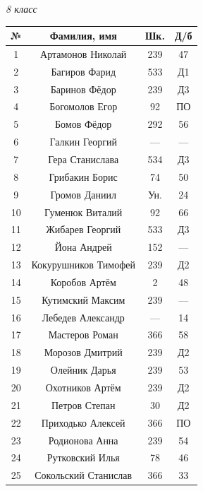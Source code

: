 \documentclass[11pt]{article}
\newlength{\h}
\newlength{\x}
\begin{document}
\begin{table}[ht]
  \begin{minipage}[t]{0.45\linewidth}\centering
    \begin{center}
      \textit{8 класс}
    \end{center}
    \begin{tabular}[h]{|c|c|c|c|}
      \hline
      \textbf{№} & \textbf{Фамилия, имя} & \textbf{Шк.} & \textbf{Д/б}\\
      \hline
      1 & Артамонов Николай & 239 & 47\\ \hline
      2 & Багиров Фарид & 533 & Д1 \\ \hline
      3 & Баринов Фёдор & 239 & Д3 \\ \hline
      4 & Богомолов Егор &  92 & ПО \\ \hline
      5 & Бомов Фёдор & 292 & 56 \\ \hline
      6 & Галкин Георгий & --- & --- \\ \hline
      7 & Гера Станислава & 534 & Д3 \\ \hline
      8 & Грибакин Борис & 74 & 50 \\ \hline
      9 & Громов Даниил & Ун. & 24 \\ \hline
      10 & Гуменюк Виталий & 92 & 66 \\ \hline
      11 & Жибарев Георгий & 533 & Д3 \\ \hline
      12 & Йона Андрей & 152 & --- \\ \hline
      13 & Кокурушников Тимофей & 239 & Д2 \\ \hline
      14 & Коробов Артём & 2 & 48 \\ \hline
      15 & Кутимский Максим & 239 & --- \\ \hline
      16 & Лебедев Александр & --- & 14 \\ \hline
      17 & Мастеров Роман & 366 & 58 \\ \hline
      18 & Морозов Дмитрий & 239 & Д2 \\ \hline
      19 & Олейник Дарья & 239 & 53 \\ \hline
      20 & Охотников Артём & 239 & Д2 \\ \hline
      21 & Петров Степан & 30 & Д2 \\ \hline
      22 & Приходько Алексей & 366 & ПО \\ \hline
      23 & Родионова Анна & 239 & 54 \\ \hline
      24 & Рутковский Илья & 78 & 46 \\ \hline
      25 & Сокольский Станислав & 366 & 33 \\ \hline

\end{tabular}
\end{minipage}
\end{table}
\end{document}
